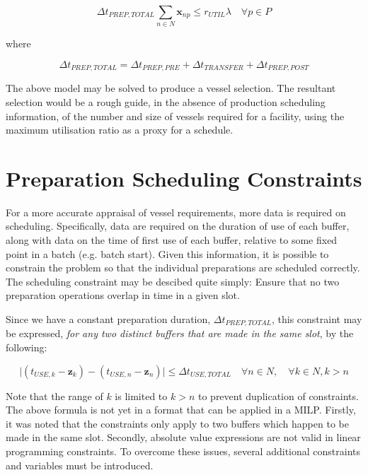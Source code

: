 \begin{equation}
    \Delta t_{PREP,TOTAL} \sum_{n \in N} \boldsymbol{x}_{np} \le r_{UTIL} 
    \lambda \quad \forall p \in P
\end{equation}

where

\begin{equation}
    \Delta t_{PREP,TOTAL} = \Delta t_{PREP,PRE} + \Delta t_{TRANSFER} +
    \Delta t_{PREP,POST}  
\end{equation}

The above model may be solved to produce a vessel selection.
The resultant selection would be a rough guide, in the absence of production
scheduling information, of the number and size of vessels required for a 
facility, using the maximum utilisation ratio as a proxy for a schedule.

\section{Preparation Scheduling Constraints}\label{S.prepsched}

For a more accurate appraisal of vessel requirements, more data is required
on scheduling.
Specifically, data are required on the duration of use of each buffer, along
with data on the time of first use of each buffer, relative to some fixed point
in a batch (e.g. batch start).
Given this information, it is possible to constrain the problem so that the
individual preparations are scheduled correctly.
The scheduling constraint may be descibed quite simply:
Ensure that no two preparation operations overlap in time in a given slot.

Since we have a constant preparation duration, $ \Delta t_{PREP,TOTAL} $, this
constraint may be expressed, \emph{for any two distinct buffers that are made
in the same slot}, by the following:

\begin{equation}
    \lvert \left( t_{USE,k} - \boldsymbol{z}_{k} \right) - \left( t_{USE,n} - 
    \boldsymbol{z}_{n} \right) \rvert \le \Delta t_{USE,TOTAL} \quad \forall n 
    \in N, \quad \forall k \in N, k > n
\end{equation}

Note that the range of $ k $ is limited to $ k > n $ to prevent duplication
of constraints.
The above formula is not yet in a format that can be applied in a MILP.
Firstly, it was noted that the constraints only apply to two buffers which
happen to be made in the same slot.
Secondly, absolute value expressions are not valid in linear programming
constraints.
To overcome these issues, several additional constraints and variables must be
introduced.

